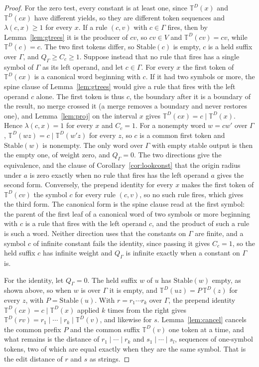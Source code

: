 \documentclass[11pt,a4paper]{article}
\theoremstyle{definition}
\theoremstyle{plain}
\newcommand{\T}{\mathbb{T}}
\newcommand{\Stable}{\mathrm{Stable}}
\begin{document}
\begin{proof}
For the zero test, every constant is at least one, since \(\T^D(x)\) and \(\T^D(cx)\) have different yields, so they are
different token sequences and \(\lambda(c, x) \ge 1\) for every \(x\). If a rule \((c, v)\) with \(c \in \Gamma\) fires,
then by Lemma~\ref{lem:gtrees} it is the producer of \(cv\), so \(cv \in V\) and \(\T^D(cv) = cv\), while
\(\T^D(c) = c\). The two first tokens differ, so \(\Stable(c)\) is empty, \(c\) is a held suffix over \(\Gamma\), and
\(Q_\Gamma \ge C_c \ge 1\). Suppose instead that no rule that fires has a single symbol of \(\Gamma\) as its left
operand, and let \(c \in \Gamma\). For every \(x\) the first token of \(\T^D(cx)\) is a canonical word beginning with
\(c\). If it had two symbols or more, the spine clause of Lemma~\ref{lem:gtrees} would give a rule that fires with the
left operand \(c\) alone. The first token is thus \(c\), the boundary after it is a boundary of the result, no merge
crossed it (a merge removes a boundary and never restores one), and Lemma~\ref{lem:proj} on the interval \(x\) gives
\(\T^D(cx) = c \mid \T^D(x)\). Hence \(\lambda(c, x) = 1\) for every \(x\) and \(C_c = 1\). For a nonempty word
\(w = cw'\) over \(\Gamma\), \(\T^D(wz) = c \mid \T^D(w'z)\) for every \(z\), so \(c\) is a common first token and
\(\Stable(w)\) is nonempty. The only word over \(\Gamma\) with empty stable output is then the empty one, of weight
zero, and \(Q_\Gamma = 0\). The two directions give the equivalence, and the clause of Corollary~\ref{cor:lookconst}
that the origin radius under \(a\) is zero exactly when no rule that fires has the left operand \(a\) gives the second
form. Conversely, the prepend identity for every \(x\) makes the first token of \(\T^D(cv)\) the symbol \(c\) for every
rule \((c, v)\), so no such rule fires, which gives the third form. The canonical form is the spine clause read at the
first symbol: the parent of the first leaf of a canonical word of two symbols or more beginning with \(c\) is a rule
that fires with the left operand \(c\), and the product of such a rule is such a word. Neither direction uses that the
constants on \(\Gamma\) are finite, and a symbol \(c\) of infinite constant fails the identity, since passing it gives
\(C_c = 1\), so the held suffix \(c\) has infinite weight and \(Q_\Gamma\) is infinite exactly when a constant on
\(\Gamma\) is.

For the identity, let \(Q_\Gamma = 0\). The held suffix \(w\) of \(u\) has \(\Stable(w)\) empty, as shown above, so when
\(w\) is over \(\Gamma\) it is empty, and \(\T^D(uz) = P\,\T^D(z)\) for every \(z\), with \(P = \Stable(u)\). With
\(r = r_1 \cdots r_k\) over \(\Gamma\), the prepend identity \(\T^D(cx) = c \mid \T^D(x)\) applied \(k\) times from the
right gives \(\T^D(rv) = r_1 \mid \cdots \mid r_k \mid \T^D(v)\), and likewise for \(s\). Lemma~\ref{lem:cancel} cancels
the common prefix \(P\) and the common suffix \(\T^D(v)\) one token at a time, and what remains is the distance of
\(r_1 \mid \cdots \mid r_k\) and \(s_1 \mid \cdots \mid s_l\), sequences of one-symbol tokens, two of which are equal
exactly when they are the same symbol. That is the edit distance of \(r\) and \(s\) as strings.


\end{proof}
\end{document}
